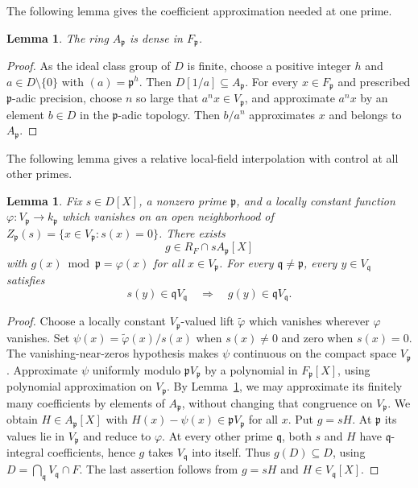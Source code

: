 \documentclass[11pt]{amsart}
\newtheorem{lemma}[theorem]{Lemma}
\theoremstyle{definition}
\theoremstyle{remark}
\begin{document}
The following lemma gives the coefficient approximation needed at one prime.
\begin{lemma}\label{lem:pintdensity}
The ring $A_{\mathfrak p}$ is dense in $F_{\mathfrak p}$.
\end{lemma}
\begin{proof}
As the ideal class group of $D$ is finite, choose a positive integer
$h$ and $a\in D\setminus\{0\}$ with $(a)=\mathfrak p^h$.
Then $D[1/a]\subseteq A_{\mathfrak p}$.  For every
$x\in F_{\mathfrak p}$ and prescribed $\mathfrak p$-adic precision,
choose $n$ so large that $a^n x\in V_{\mathfrak p}$, and approximate
$a^nx$ by an element $b\in D$ in the $\mathfrak p$-adic topology.
Then $b/a^n$ approximates $x$ and belongs to $A_{\mathfrak p}$.
\end{proof}

The following lemma gives a relative local-field interpolation with control at all other primes.
\begin{lemma}\label{lem:nfinterp}
Fix $s\in D[X]$, a nonzero prime $\mathfrak p$, and a locally constant
function $\varphi:V_{\mathfrak p}\to k_{\mathfrak p}$ which vanishes
on an open neighborhood of
$Z_{\mathfrak p}(s)=\{x\in V_{\mathfrak p}:s(x)=0\}$.
There exists
\[
g\in R_F\cap s A_{\mathfrak p}[X]
\]
with $g(x)\bmod\mathfrak p=\varphi(x)$ for all
$x\in V_{\mathfrak p}$.  For every
$\mathfrak q\ne\mathfrak p$, every $y\in V_{\mathfrak q}$ satisfies
\[
s(y)\in\mathfrak q V_{\mathfrak q}
\quad\Longrightarrow\quad
g(y)\in\mathfrak q V_{\mathfrak q}.
\]
\end{lemma}
\begin{proof}
Choose a locally constant $V_{\mathfrak p}$-valued lift
$\widetilde\varphi$ which vanishes wherever $\varphi$ vanishes.  Set
$\psi(x)=\widetilde\varphi(x)/s(x)$ when $s(x)\ne0$ and zero when
$s(x)=0$.  The vanishing-near-zeros hypothesis makes $\psi$
continuous on the compact space $V_{\mathfrak p}$.  Approximate $\psi$
uniformly modulo $\mathfrak p V_{\mathfrak p}$ by a polynomial in
$F_{\mathfrak p}[X]$, using polynomial approximation on $V_{\mathfrak p}$.  By
Lemma~\ref{lem:pintdensity}, we may approximate its finitely many
coefficients by elements of $A_{\mathfrak p}$, without changing
that congruence on $V_{\mathfrak p}$.
We obtain $H\in A_{\mathfrak p}[X]$ with
$H(x)-\psi(x)\in\mathfrak p V_{\mathfrak p}$ for all $x$.
Put $g=sH$.  At $\mathfrak p$ its values lie in
$V_{\mathfrak p}$ and reduce to $\varphi$.
At every other prime $\mathfrak q$, both $s$ and $H$
have $\mathfrak q$-integral coefficients, hence $g$ takes
$V_{\mathfrak q}$ into itself. Thus $g(D)\subseteq D$, using
$D=\bigcap_{\mathfrak q}V_{\mathfrak q}\cap F$.
The last assertion follows from $g=sH$ and
$H\in V_{\mathfrak q}[X]$.
\end{proof}
\end{document}
